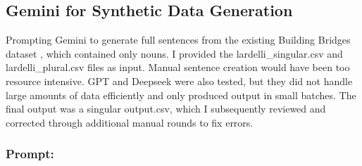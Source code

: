 

\subsection{Gemini for Synthetic Data Generation}\label{appendix:gemini_prompt}
Prompting Gemini to generate full sentences from the existing Building Bridges dataset \parencite{lardelliBuildingBridgesDataset2024}, which contained only nouns. I provided the lardelli\_singular.csv and lardelli\_plural.csv files as input. Manual sentence creation would have been too resource intensive. GPT and Deepseek were also tested, but they did not handle large amounts of data efficiently and only produced output in small batches. The final output was a singular output.csv, which I subsequently reviewed and corrected through additional manual rounds to fix errors.
\subsubsection{Prompt: } 

